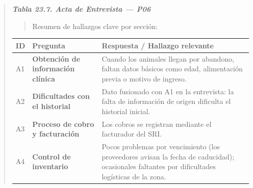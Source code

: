 \documentclass[
]{article}
\newcounter{none} %
\begin{document}
\begin{quote}
\protect{}\label{_bookmark_P06_acta}{}\emph{\textbf{Tabla 23.7. Acta de Entrevista --- P06}}

\begin{quote}
Resumen de hallazgos clave por sección:
\end{quote}

{\def\LTcaptype{none} %
\begin{longtable}[]{|
  >{\centering\arraybackslash}p{}|
  >{\raggedright\arraybackslash}p{}|
  >{\raggedright\arraybackslash}p{}|}
\hline
\begin{minipage}[b]{\linewidth}\centering
\textbf{ID}
\end{minipage} & \begin{minipage}[b]{\linewidth}\centering
\textbf{Pregunta}
\end{minipage} & \begin{minipage}[b]{\linewidth}\raggedright
\textbf{Respuesta / Hallazgo relevante}
\end{minipage} \\
\hline
\endhead
\hline
\endlastfoot
A1 & \textbf{Obtención de información clínica} &
\begin{minipage}[t]{\linewidth}\raggedright
Cuando los animales llegan por abandono, faltan datos básicos como edad, alimentación previa o motivo de ingreso.
\end{minipage} \\
\hline
A2 & \textbf{Dificultades con el historial} &
\begin{minipage}[t]{\linewidth}\raggedright
Dato fusionado con A1 en la entrevista: la falta de información de origen dificulta el historial inicial.
\end{minipage} \\
\hline
A3 & \textbf{Proceso de cobro y facturación} &
\begin{minipage}[t]{\linewidth}\raggedright
Los cobros se registran mediante el facturador del SRI.
\end{minipage} \\
\hline
A4 & \textbf{Control de inventario} &
\begin{minipage}[t]{\linewidth}\raggedright
Pocos problemas por vencimiento (los proveedores avisan la fecha de caducidad); ocasionales faltantes por dificultades logísticas de la zona.
\end{minipage} \\

\end{longtable}}
\end{quote}
\end{document}
